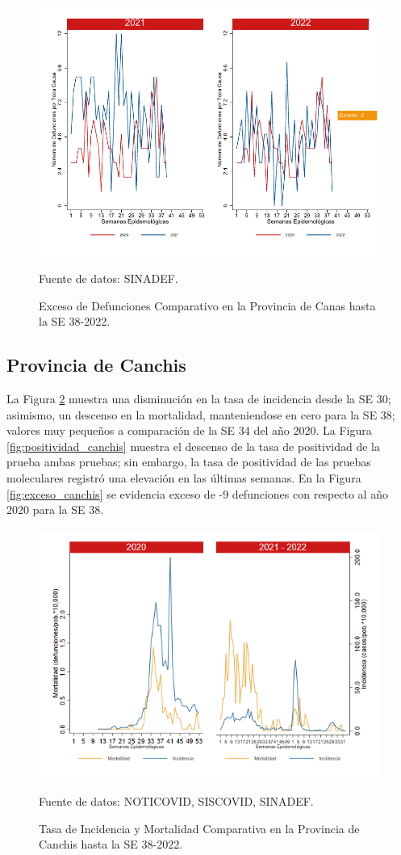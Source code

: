 \documentclass[12pt,a4paper,openany]{book}
\begin{document}
	\begin{figure}[h]
		\caption{Exceso de Defunciones Comparativo en la Provincia de Canas hasta la SE 38-2022.}\label{fig:exceso_canas}
		\begin{center}
			\includegraphics[width=0.7\linewidth]{../figuras/exceso_4.pdf}
		\end{center}
		{\footnotesize {Fuente de datos: SINADEF.}}
	\end{figure}
	
	\clearpage
	
	\subsection*{Provincia de Canchis}
	\noindent La Figura \ref{fig:inc_mort_canchis} muestra una disminución en la tasa de incidencia desde la SE 30; asimismo, un descenso en la mortalidad, manteniendose en cero para la SE 38; valores muy pequeños a comparación de la SE 34 del año 2020.
	\noindent La Figura \ref{fig:positividad_canchis} muestra el descenso de la tasa de positividad de la prueba ambas pruebas; sin embargo, la tasa de positividad de las pruebas moleculares registró una elevación en las últimas semanas.
	En la Figura \ref{fig:exceso_canchis} se evidencia exceso de -9 defunciones con respecto al año 2020 para la SE 38.
	
	\begin{figure}[h]
		\caption{Tasa de Incidencia y Mortalidad Comparativa en la Provincia de Canchis hasta la SE 38-2022.}\label{fig:inc_mort_canchis}
		\begin{center}
			\includegraphics[width=0.85\linewidth]{../figuras/incidencia_mortalidad_20_21_5.png}
		\end{center}
		{\footnotesize {Fuente de datos: NOTICOVID, SISCOVID, SINADEF.}}
	\end{figure}
	
\end{document}
